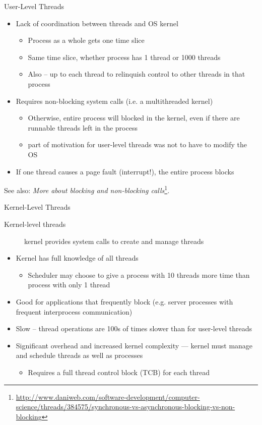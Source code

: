 \begin{frame}{User-Level Threads}
  \begin{itemize}
  \item[\alert{🙁}]  Lack of coordination between threads and OS kernel
    \begin{itemize}
    \item Process as a whole gets one time slice
    \item Same time slice, whether process has 1 thread or 1000 threads
    \item Also -- up to each thread to relinquish control to other threads in that process
    \end{itemize}
  \item[\alert{🙁}] Requires non-blocking system calls (i.e. a multithreaded kernel)
    \begin{itemize}
    \item Otherwise, entire process will blocked in the kernel, even if there are runnable threads
      left in the process
    \item part of motivation for user-level threads was not to have to modify the OS
    \end{itemize}
  \item[\alert{🙁}] If one thread causes a page fault (interrupt!), the entire process
    blocks
  \end{itemize}
\end{frame}

See also: \emph{More about blocking and non-blocking calls}\footnote{\url{http://www.daniweb.com/software-development/computer-science/threads/384575/synchronous-vs-asynchronous-blocking-vs-non-blocking}}.

\begin{frame}{Kernel-Level Threads}
  \begin{description}
  \item[Kernel-level threads] kernel provides system calls to create and manage threads
  \end{description}
  \begin{itemize}
  \item[🙂] Kernel has full knowledge of all threads
    \begin{itemize}
    \item Scheduler may choose to give a process with 10 threads more time than process with only 1
      thread
    \end{itemize}
  \item[🙂] Good for applications that frequently block (e.g. server processes with
    frequent interprocess communication)
  \item[\alert{🙁}] Slow -- thread operations are 100s of times slower than for
    user-level threads
  \item[\alert{🙁}] Significant overhead and increased kernel complexity --- kernel must
    manage and schedule threads as well as processes
    \begin{itemize}
    \item Requires a full thread control block (TCB) for each thread
    \end{itemize}
  \end{itemize}
\end{frame}

